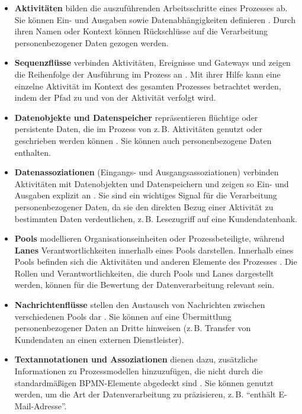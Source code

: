 \begin{itemize}
    \item \textbf{Aktivitäten} bilden die auszuführenden Arbeitsschritte eines Prozesses ab. Sie können Ein- und Ausgaben sowie Datenabhängigkeiten definieren \cite{omgbpmn}. Durch ihren Namen oder Kontext können Rückschlüsse auf die Verarbeitung personenbezogener Daten gezogen werden.
    \item \textbf{Sequenzflüsse} verbinden Aktivitäten, Ereignisse und Gateways und zeigen die Reihenfolge der Ausführung im Prozess an \cite{omgbpmn}. Mit ihrer Hilfe kann eine einzelne Aktivität im Kontext des gesamten Prozesses betrachtet werden, indem der Pfad zu und von der Aktivität verfolgt wird.
    \item \textbf{Datenobjekte und Datenspeicher} repräsentieren flüchtige oder persistente Daten, die im Prozess von z.\,B. Aktivitäten genutzt oder geschrieben werden können \cite{omgbpmn}. Sie können auch personenbezogene Daten enthalten.
    \item \textbf{Datenassoziationen} (Eingangs- und Ausgangsassoziationen) verbinden Aktivitäten mit Datenobjekten und Datenspeichern und zeigen so Ein- und Ausgaben explizit an \cite{omgbpmn}. Sie sind ein wichtiges Signal für die Verarbeitung personenbezogener Daten, da sie den direkten Bezug einer Aktivität zu bestimmten Daten verdeutlichen, z.\,B. Lesezugriff auf eine Kundendatenbank.
    \item \textbf{Pools} modellieren Organisationseinheiten oder Prozessbeteiligte, während \textbf{Lanes} Verantwortlichkeiten innerhalb eines Pools darstellen. Innerhalb eines Pools befinden sich die Aktivitäten und anderen Elemente des Prozesses \cite{omgbpmn}. Die Rollen und Verantwortlichkeiten, die durch Pools und Lanes dargestellt werden, können für die Bewertung der Datenverarbeitung relevant sein.
    \item \textbf{Nachrichtenflüsse} stellen den Austausch von Nachrichten zwischen verschiedenen Pools dar \cite{omgbpmn}. Sie können auf eine Übermittlung personenbezogener Daten an Dritte hinweisen (z.\,B. Transfer von Kundendaten an einen externen Dienstleister).
    \item \textbf{Textannotationen und Assoziationen} dienen dazu, zusätzliche Informationen zu Prozessmodellen hinzuzufügen, die nicht durch die standardmäßigen BPMN-Elemente abgedeckt sind \cite{omgbpmn}. Sie können genutzt werden, um die Art der Datenverarbeitung zu präzisieren, z.\,B. \enquote{enthält E-Mail-Adresse}.
\end{itemize}

